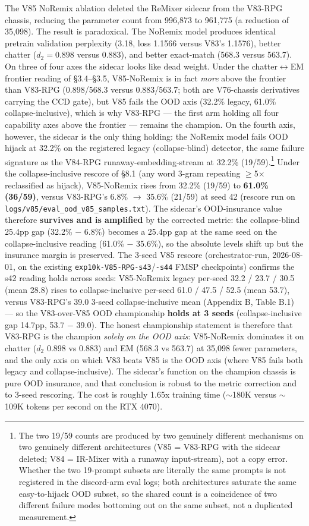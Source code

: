 \documentclass[11pt]{article}
\begin{document}
The V85 NoRemix ablation deleted the ReMixer sidecar from the V83-RPG chassis, reducing the parameter count from 996,873 to 961,775 (a reduction of 35,098). The result is paradoxical. The NoRemix model produces identical pretrain validation perplexity (3.18, loss 1.1566 versus V83's 1.1576), better chatter ($d_2 = 0.898$ versus 0.883), and better exact-match (568.3 versus 563.7). On three of four axes the sidecar looks like dead weight. Under the chatter$\leftrightarrow$EM frontier reading of \S3.4--\S3.5, V85-NoRemix is in fact \emph{more} above the frontier than V83-RPG (0.898/568.3 versus 0.883/563.7; both are V76-chassis derivatives carrying the CCD gate), but V85 fails the OOD axis (32.2\% legacy, 61.0\% collapse-inclusive), which is why V83-RPG --- the first arm holding all four capability axes above the frontier --- remains the champion. On the fourth axis, however, the sidecar is the only thing holding: the NoRemix model fails OOD hijack at 32.2\% on the registered legacy (collapse-blind) detector, the same failure signature as the V84-RPG runaway-embedding-stream at 32.2\% (19/59).\footnote{The two 19/59 counts are produced by two genuinely different mechanisms on two genuinely different architectures (V85 = V83-RPG with the sidecar deleted; V84 = IR-Mixer with a runaway input-stream), not a copy error. Whether the two 19-prompt subsets are literally the same prompts is not registered in the discord-arm eval logs; both architectures saturate the same easy-to-hijack OOD subset, so the shared count is a coincidence of two different failure modes bottoming out on the same subset, not a duplicated measurement.} Under the collapse-inclusive rescore of \S8.1 (any word 3-gram repeating $\geq$5$\times$ reclassified as hijack), V85-NoRemix rises from 32.2\% (19/59) to \textbf{61.0\% (36/59)}, versus V83-RPG's 6.8\% $\to$ 35.6\% (21/59) at seed 42 (rescore run on \texttt{logs/v85/eval\_ood\_v85\_samples.txt}). The sidecar's OOD-insurance value therefore \textbf{survives and is amplified} by the corrected metric: the collapse-blind 25.4pp gap (32.2\% $-$ 6.8\%) becomes a 25.4pp gap at the same seed on the collapse-inclusive reading (61.0\% $-$ 35.6\%), so the absolute levels shift up but the insurance margin is preserved. The 3-seed V85 rescore (orchestrator-run, 2026-08-01, on the existing \texttt{exp10k-V85-RPG-s43}/\texttt{-s44} FMSP checkpoints) confirms the s42 reading holds across seeds: V85-NoRemix legacy per-seed 32.2 / 23.7 / 30.5 (mean 28.8) rises to collapse-inclusive per-seed 61.0 / 47.5 / 52.5 (mean 53.7), versus V83-RPG's 39.0 3-seed collapse-inclusive mean (Appendix B, Table B.1) --- so the V83-over-V85 OOD championship \textbf{holds at 3 seeds} (collapse-inclusive gap 14.7pp, 53.7 $-$ 39.0). The honest championship statement is therefore that V83-RPG is the champion \emph{solely on the OOD axis}: V85-NoRemix dominates it on chatter ($d_2$ 0.898 vs 0.883) and EM (568.3 vs 563.7) at 35,098 fewer parameters, and the only axis on which V83 beats V85 is the OOD axis (where V85 fails both legacy and collapse-inclusive). The sidecar's function on the champion chassis is pure OOD insurance, and that conclusion is robust to the metric correction and to 3-seed rescoring. The cost is roughly 1.65x training time ($\sim$180K versus $\sim$109K tokens per second on the RTX 4070).
\end{document}
